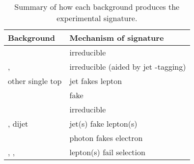 \begin{table}
	\begin{tabular}{l@{\hskip 0.3in}l}
		\toprule
		Background        & Mechanism of \HepProcess{\Plepton\Plepton + \met} signature \\
		\midrule
		\WW               & irreducible \\
		\ttbar, \HepProcess{\PW \Ptop} & irreducible (aided by jet \Pbottom-tagging) \\
		other single top  & jet fakes lepton \\
		\DYll             & fake \met \\
		\DYtt             & irreducible \\
		\Wjets, dijet     & jet(s) fake lepton(s) \\
		\Wgamma           & photon fakes electron \\
		\WZ, \Wgstar, \ZZ & lepton(s) fail selection \\
		\bottomrule
	\end{tabular}
	\caption{Summary of how each background produces the 
	\HepProcess{\Plepton\Plepton + \met} experimental signature.}
	\label{tab:bkg_summary}
\end{table}

